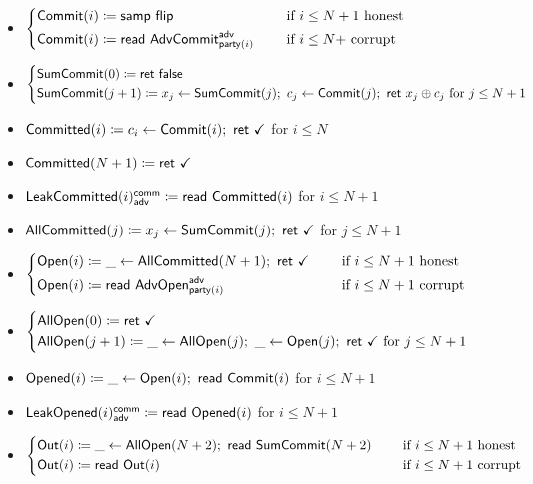 \begin{itemize}
\item {\color{blue} $\begin{cases*} \Commit(i) \coloneqq \samp{\flip} & \hspace{10pt} \text{if $i \leq N+1$ honest} \\ \Commit(i) \coloneqq \read{\AdvCommit^\adv_{\party(i)}} & \hspace{10pt} \text{if $i \leq N+$ corrupt} \end{cases*}$}
\item {\color{blue} $\begin{cases*} \SumCommit(0) \coloneqq \ret{\false} \\ \SumCommit(j+1) \coloneqq x_j \leftarrow \SumCommit(j); \ c_j \leftarrow \Commit(j); \ \ret{x_j \oplus c_j} \text{ for $j \leq N+1$} \end{cases*}$}
\item {\color{magenta} $\mathsf{Committed}(i) \coloneqq c_i \leftarrow \mathsf{Commit}(i); \ \mathsf{ret} \ \checkmark$ for $i \leq N$}
\item {\color{magenta} $\mathsf{Committed}(N+1) \coloneqq \mathsf{ret} \ \checkmark$}
\item {\color{magenta} $\mathsf{LeakCommitted}(i)^{\mathsf{comm}}_{\mathsf{adv}} \coloneqq \mathsf{read} \ \mathsf{Committed}(i)$ for $i \leq N+1$}
\item {\color{magenta} $\mathsf{AllCommitted}(j) \coloneqq x_j \leftarrow \mathsf{SumCommit}(j); \ \mathsf{ret} \ \checkmark$ for $j \leq N+1$}
\item {\color{teal} $\begin{cases*} \Open(i) \coloneqq \_ \leftarrow \AllCommitted(N+1); \ \ret{\checkmark} & \hspace{10pt} \text{if $i \leq N+1$ honest} \\ \Open(i) \coloneqq \read{\AdvOpen^\adv_{\party(i)}} & \hspace{10pt} \text{if $i \leq N+1$ corrupt} \end{cases*}$}
\item {\color{teal} $\begin{cases*} \AllOpen(0) \coloneqq \ret{\checkmark} \\ \AllOpen(j+1) \coloneqq \_ \leftarrow \AllOpen(j); \ \_ \leftarrow \Open(j); \ \ret{\checkmark} \text{ for $j \leq N+1$} \end{cases*}$}
\item {\color{red} $\mathsf{Opened}(i) \coloneqq \_ \leftarrow \mathsf{Open}(i); \ \mathsf{read} \ \mathsf{Commit}(i)$ for $i \leq N+1$}
\item {\color{red} $\mathsf{LeakOpened}(i)^{\mathsf{comm}}_{\mathsf{adv}} \coloneqq \mathsf{read} \ \mathsf{Opened}(i)$ for $i \leq N+1$}
\item $\begin{cases*} \Out(i) \coloneqq \_ \leftarrow \AllOpen(N+2); \ \read{\SumCommit(N+2)} & \hspace{10pt} \text{if $i \leq N+1$ honest} \\ \Out(i) \coloneqq \read{\Out(i)} & \hspace{10pt} \text{if $i \leq N+1$ corrupt} \end{cases*}$
\end{itemize}

